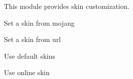 This module provides skin customization.




\begin{example}{Set a skin from mojang}
\end{example}

\begin{example}{Set a skin from url}
\end{example}

\begin{example}{Use default skins}
\end{example}

\begin{example}{Use online skin}
\end{example}
